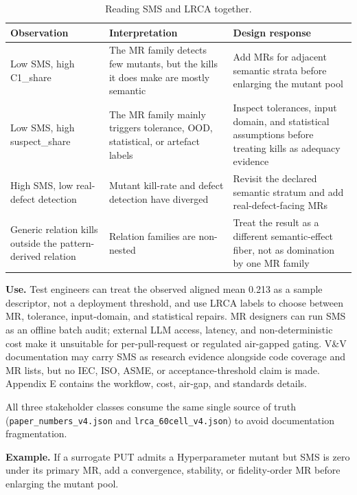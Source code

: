 \documentclass[manuscript,screen,review]{acmart}
\begin{document}
{%
\begin{longtable}[]{@{}
  >{\raggedright\arraybackslash}p{}
  >{\raggedright\arraybackslash}p{}
  >{\raggedright\arraybackslash}p{}@{}}
\caption{Reading SMS and LRCA together.}\label{tab:sms-lrca-reading}\\
\toprule\noalign{}
Observation & Interpretation & Design response \\
\midrule\noalign{}
\endfirsthead
\endhead
\bottomrule\noalign{}
\endlastfoot
Low SMS, high C1\_share & The MR family detects few mutants, but the
kills it does make are mostly semantic & Add MRs for adjacent semantic
strata before enlarging the mutant pool \\
Low SMS, high suspect\_share & The MR family mainly triggers tolerance,
OOD, statistical, or artefact labels & Inspect tolerances, input domain,
and statistical assumptions before treating kills as adequacy evidence \\
High SMS, low real-defect detection & Mutant kill-rate and defect
detection have diverged & Revisit the declared semantic stratum and add
real-defect-facing MRs \\
Generic relation kills outside the pattern-derived relation & Relation
families are non-nested & Treat the result as a different
semantic-effect fiber, not as domination by one MR family \\
\end{longtable}
}

\textbf{Use.} Test engineers can treat the observed aligned mean 0.213
as a sample descriptor, not a deployment threshold, and use LRCA labels
to choose between MR, tolerance, input-domain, and statistical repairs.
MR designers can run SMS as an offline batch audit; external LLM access,
latency, and non-deterministic cost make it unsuitable for
per-pull-request or regulated air-gapped gating. V\&V documentation may
carry SMS as research evidence alongside code coverage and MR lists,
but no IEC, ISO, ASME, or acceptance-threshold claim is made. Appendix E
contains the workflow, cost, air-gap, and standards details.

All three stakeholder classes consume the same single source of truth
(\texttt{paper\_numbers\_v4.json} and \texttt{lrca\_60cell\_v4.json}) to
avoid documentation fragmentation.

\textbf{Example.} If a surrogate PUT admits a Hyperparameter mutant but
SMS is zero under its primary MR, add a convergence, stability, or
fidelity-order MR before enlarging the mutant pool.
\end{document}

